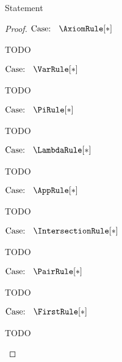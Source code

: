 
\begin{theorem}
    Statement
\end{theorem}
\begin{proof}

$\text{Case: }\begin{array}{c} \AxiomRule[*] \end{array}$
\begin{proofcase}
    TODO
\end{proofcase}

$\text{Case: }\begin{array}{c} \VarRule[*] \end{array}$
\begin{proofcase}
    TODO
\end{proofcase}

$\text{Case: }\begin{array}{c} \PiRule[*] \end{array}$
\begin{proofcase}
    TODO
\end{proofcase}

$\text{Case: }\begin{array}{c} \LambdaRule[*] \end{array}$
\begin{proofcase}
    TODO
\end{proofcase}

$\text{Case: }\begin{array}{c} \AppRule[*] \end{array}$
\begin{proofcase}
    TODO
\end{proofcase}

$\text{Case: }\begin{array}{c} \IntersectionRule[*] \end{array}$
\begin{proofcase}
    TODO
\end{proofcase}

$\text{Case: }\begin{array}{c} \PairRule[*] \end{array}$
\begin{proofcase}
    TODO
\end{proofcase}

$\text{Case: }\begin{array}{c} \FirstRule[*] \end{array}$
\begin{proofcase}
    TODO
\end{proofcase}


\end{proof}
